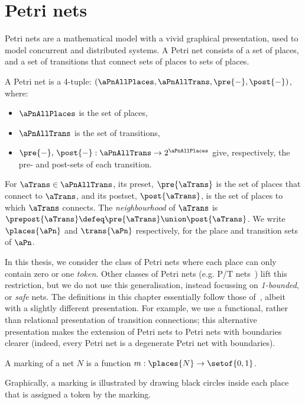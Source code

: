 \section{Petri nets}

Petri nets are a mathematical model with a vivid graphical presentation, used to
model concurrent and distributed systems. A Petri net consists of a set of
places, and a set of transitions that connect sets of places to sets of places.
\begin{definition}
A Petri net is a 4-tuple:
$(\aPnAllPlaces,\aPnAllTrans,\pre{-},\post{-})$, where:
\begin{itemize}
\item $\aPnAllPlaces$ is the set of places,
\item $\aPnAllTrans$ is the set of transitions,
\item $\pre{-},\,\post{-}:\aPnAllTrans \to 2^{\aPnAllPlaces}$ give,
    respectively, the pre- and post-sets of each transition.
\end{itemize}
\end{definition}

For $\aTrans \in \aPnAllTrans$, its preset, $\pre{\aTrans}$ is the set of places that
connect to $\aTrans$, and its postset, $\post{\aTrans}$, is the set of
places to which $\aTrans$ connects. The
\emph{neighbourhood} of $\aTrans$ is $\prepost{\aTrans} \defeq \pre{\aTrans}
\union \post{\aTrans}$.  We write $\places{\aPn}$ and $\trans{\aPn}$
respectively, for the place and transition sets of $\aPn$.

In this thesis, we consider the class of Petri nets where each place can only contain zero or one
\emph{token}. Other classes of Petri nets (e.g. P/T nets~\cite{Desel1998}) lift this restriction,
but we do not use this generalisation, instead focussing on \emph{1-bounded}, or \emph{safe} nets.
The definitions in this chapter essentially follow those of~\cite{Engelfriet1998}, albeit with a
slightly different presentation. For example, we use a functional, rather than relational
presentation of transition connections; this alternative presentation makes the extension of Petri
nets to Petri nets with boundaries clearer (indeed, every Petri net is a degenerate Petri net with
boundaries).

\begin{definition}[Marking]
    A marking of a net $N$ is a function $m : \places{N} \to \setof{0,1}$.
\end{definition}

Graphically, a marking is illustrated by drawing black circles inside each
place that is assigned a token by the marking.

